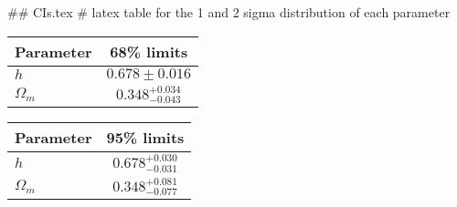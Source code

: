 ## CIs.tex
# latex table for the 1 and 2 sigma distribution of each parameter

\begin{tabular} { l  c}
 Parameter &  68\% limits\\
\hline
{\boldmath$h              $} & $0.678\pm 0.016            $\\
{\boldmath$\Omega_m       $} & $0.348^{+0.034}_{-0.043}   $\\
\hline
\end{tabular}

\begin{tabular} { l  c}
 Parameter &  95\% limits\\
\hline
{\boldmath$h              $} & $0.678^{+0.030}_{-0.031}   $\\
{\boldmath$\Omega_m       $} & $0.348^{+0.081}_{-0.077}   $\\
\hline
\end{tabular}
